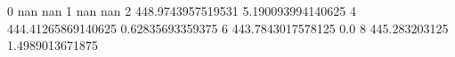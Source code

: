 0 nan nan
1 nan nan
2 448.9743957519531 5.190093994140625
4 444.41265869140625 0.62835693359375
6 443.7843017578125 0.0
8 445.283203125 1.4989013671875
